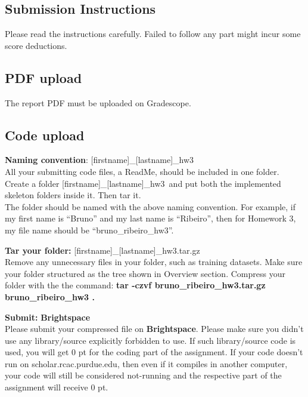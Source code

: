 \documentclass{article}
\newcommand{\homeworknumber}{3}
\begin{document}

%
\subsection*{Submission Instructions}
%
Please read the instructions carefully.
%
Failed to follow any part might incur some score deductions.

%
\hfill

%
\subsection*{\bf PDF upload}
%
The report PDF must be uploaded on Gradescope.

%
\hfill

%
\subsection*{\bf Code upload}
%
\noindent \textbf{Naming convention}:
%
[firstname]\_[lastname]\_hw\homeworknumber
\\
%
All your submitting code files, a ReadMe, should be included in one folder. Create a folder [firstname]\_[lastname]\_hw\homeworknumber \ and put both the implemented skeleton folders inside it. Then tar it.\\
%
The folder should be named with the above naming convention.
%
For example, if my first name is ``Bruno'' and my last name is ``Ribeiro'',
then for Homework \homeworknumber, my file name should be
``bruno\_ribeiro\_hw\homeworknumber''.

%
\hfill

%
\noindent \textbf{Tar your folder:}
%
[firstname]\_[lastname]\_hw\homeworknumber.tar.gz
\\
%
Remove any unnecessary files in your folder, such as training datasets.
%
Make sure your folder structured as the tree shown in Overview section.
%
Compress your folder with the the command:
%
\textbf{
    tar -czvf bruno\_ribeiro\_hw\homeworknumber.tar.gz bruno\_ribeiro\_hw\homeworknumber
.}

%
\hfill

%
\noindent \textbf{Submit:}
%
{\bf Brightspace}
\\
%
Please submit your compressed file on \textbf{Brightspace}.
%
Please make sure you didn't use any library/source explicitly forbidden to use.
%
If such library/source code is used, you will get 0 pt for the coding part of
the assignment.
%
If your code doesn't run on scholar.rcac.purdue.edu, then even if it compiles
in another computer, your code will still be considered not-running and the
respective part of the assignment will receive 0 pt.
\end{document}
